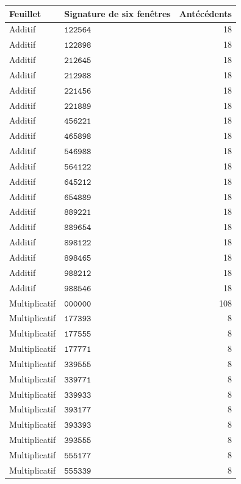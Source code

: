 \begin{table}[!htbp]\centering\fontsize{9}{10.4}\selectfont\renewcommand{\arraystretch}{1.02}\begin{tabular}{@{}llr@{}}
\toprule Feuillet&Signature de six fenêtres&Antécédents\\\midrule
Additif&\(\mathtt{122564}\)&18\\
Additif&\(\mathtt{122898}\)&18\\
Additif&\(\mathtt{212645}\)&18\\
Additif&\(\mathtt{212988}\)&18\\
Additif&\(\mathtt{221456}\)&18\\
Additif&\(\mathtt{221889}\)&18\\
Additif&\(\mathtt{456221}\)&18\\
Additif&\(\mathtt{465898}\)&18\\
Additif&\(\mathtt{546988}\)&18\\
Additif&\(\mathtt{564122}\)&18\\
Additif&\(\mathtt{645212}\)&18\\
Additif&\(\mathtt{654889}\)&18\\
Additif&\(\mathtt{889221}\)&18\\
Additif&\(\mathtt{889654}\)&18\\
Additif&\(\mathtt{898122}\)&18\\
Additif&\(\mathtt{898465}\)&18\\
Additif&\(\mathtt{988212}\)&18\\
Additif&\(\mathtt{988546}\)&18\\
Multiplicatif&\(\mathtt{000000}\)&108\\
Multiplicatif&\(\mathtt{177393}\)&8\\
Multiplicatif&\(\mathtt{177555}\)&8\\
Multiplicatif&\(\mathtt{177771}\)&8\\
Multiplicatif&\(\mathtt{339555}\)&8\\
Multiplicatif&\(\mathtt{339771}\)&8\\
Multiplicatif&\(\mathtt{339933}\)&8\\
Multiplicatif&\(\mathtt{393177}\)&8\\
Multiplicatif&\(\mathtt{393393}\)&8\\
Multiplicatif&\(\mathtt{393555}\)&8\\
Multiplicatif&\(\mathtt{555177}\)&8\\
Multiplicatif&\(\mathtt{555339}\)&8\\

\end{tabular}
\end{table}
